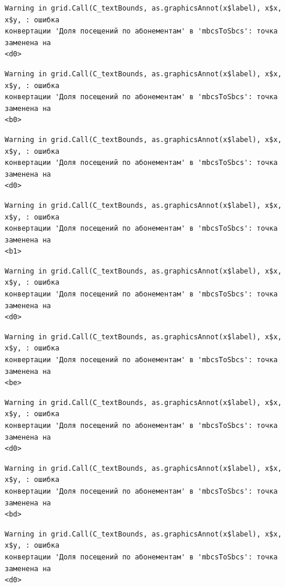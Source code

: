\documentclass[
  letterpaper,
  DIV=11,
  numbers=noendperiod]{scrreprt}
\begin{document}
\begin{verbatim}
Warning in grid.Call(C_textBounds, as.graphicsAnnot(x$label), x$x, x$y, : ошибка
конвертации 'Доля посещений по абонементам' в 'mbcsToSbcs': точка заменена на
<d0>
\end{verbatim}

\begin{verbatim}
Warning in grid.Call(C_textBounds, as.graphicsAnnot(x$label), x$x, x$y, : ошибка
конвертации 'Доля посещений по абонементам' в 'mbcsToSbcs': точка заменена на
<b0>
\end{verbatim}

\begin{verbatim}
Warning in grid.Call(C_textBounds, as.graphicsAnnot(x$label), x$x, x$y, : ошибка
конвертации 'Доля посещений по абонементам' в 'mbcsToSbcs': точка заменена на
<d0>
\end{verbatim}

\begin{verbatim}
Warning in grid.Call(C_textBounds, as.graphicsAnnot(x$label), x$x, x$y, : ошибка
конвертации 'Доля посещений по абонементам' в 'mbcsToSbcs': точка заменена на
<b1>
\end{verbatim}

\begin{verbatim}
Warning in grid.Call(C_textBounds, as.graphicsAnnot(x$label), x$x, x$y, : ошибка
конвертации 'Доля посещений по абонементам' в 'mbcsToSbcs': точка заменена на
<d0>
\end{verbatim}

\begin{verbatim}
Warning in grid.Call(C_textBounds, as.graphicsAnnot(x$label), x$x, x$y, : ошибка
конвертации 'Доля посещений по абонементам' в 'mbcsToSbcs': точка заменена на
<be>
\end{verbatim}

\begin{verbatim}
Warning in grid.Call(C_textBounds, as.graphicsAnnot(x$label), x$x, x$y, : ошибка
конвертации 'Доля посещений по абонементам' в 'mbcsToSbcs': точка заменена на
<d0>
\end{verbatim}

\begin{verbatim}
Warning in grid.Call(C_textBounds, as.graphicsAnnot(x$label), x$x, x$y, : ошибка
конвертации 'Доля посещений по абонементам' в 'mbcsToSbcs': точка заменена на
<bd>
\end{verbatim}

\begin{verbatim}
Warning in grid.Call(C_textBounds, as.graphicsAnnot(x$label), x$x, x$y, : ошибка
конвертации 'Доля посещений по абонементам' в 'mbcsToSbcs': точка заменена на
<d0>
\end{verbatim}
\end{document}

